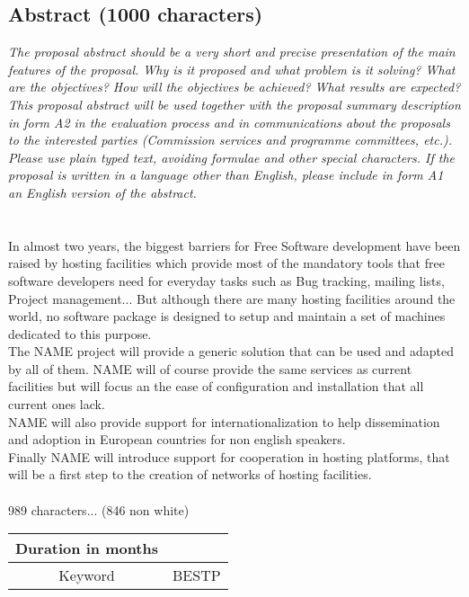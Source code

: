 \documentclass[a4paper,11pt]{report}
\begin{document}
\subsection*{Abstract (1000 characters)}
\textit{The proposal abstract should be a very short and precise presentation
of the main features of the proposal. Why is it proposed and what problem is it
solving? What are the objectives? How will the objectives be achieved? What
results are expected? This proposal abstract will be used together with the
proposal summary description in form A2 in the evaluation process and in
communications about the proposals to the interested parties (Commission
services and programme committees, etc.). Please use plain typed text, avoiding
formulae and other special characters. If the proposal is written in a language
other than English, please include in form A1 an English version of the
abstract.} \\ \\ \\
In almost two years, the biggest barriers for Free Software development have
been raised by hosting facilities which provide most of the mandatory tools
that free software developers need for everyday tasks such as Bug tracking,
mailing lists, Project management... But although there are many hosting
facilities around the world, no software package is designed to setup and
maintain a set of machines dedicated to this purpose. \\ 
The NAME project will provide a generic solution that can be used and adapted
by all of them.  NAME will of course provide the same services as current
facilities but will focus an the ease of configuration and installation that
all current ones lack. \\
NAME will also provide support for internationalization to help dissemination
and adoption in European countries for non english speakers.\\ Finally NAME
will introduce support for cooperation in hosting platforms, that will be a
first step to the creation of networks of hosting facilities. 
\\ \\ 
989 characters... (846 non white) \\
\begin{tabular}{|c|c|}
\hline
Duration in months & \\ \hline
Keyword & BESTP \\ \hline
\end{tabular}
\end{document}
